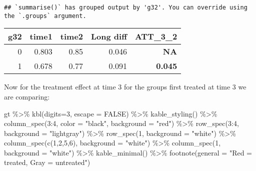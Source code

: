 \documentclass[
]{article}
\newenvironment{Shaded}{\begin{snugshade}}{\end{snugshade}}
\newcommand{\AttributeTok}[1]{\textcolor[rgb]{0.77,0.63,0.00}{#1}}
\newcommand{\ConstantTok}[1]{\textcolor[rgb]{0.00,0.00,0.00}{#1}}
\newcommand{\DecValTok}[1]{\textcolor[rgb]{0.00,0.00,0.81}{#1}}
\newcommand{\FunctionTok}[1]{\textcolor[rgb]{0.00,0.00,0.00}{#1}}
\newcommand{\NormalTok}[1]{#1}
\newcommand{\SpecialCharTok}[1]{\textcolor[rgb]{0.00,0.00,0.00}{#1}}
\newcommand{\StringTok}[1]{\textcolor[rgb]{0.31,0.60,0.02}{#1}}
\begin{document}
\begin{verbatim}
## `summarise()` has grouped output by 'g32'. You can override using the `.groups` argument.
\end{verbatim}

\begin{table}
\centering
\begin{tabular}{r|r|r|r|>{}r}
\hline
g32 & time1 & time2 & Long diff & ATT\_3\_2\\
\hline
0 & 0.803 & 0.85 & 0.046 & \textbf{NA}\\
\hline
1 & 0.678 & 0.77 & 0.091 & \textbf{0.045}\\
\hline
\end{tabular}
\end{table}

Now for the treatment effect at time 3 for the groups first treated at
time 3 we are comparing:

\begin{Shaded}
\begin{Highlighting}[]
\NormalTok{gt }\SpecialCharTok{\%\textgreater{}\%}
  \FunctionTok{kbl}\NormalTok{(}\AttributeTok{digits=}\DecValTok{3}\NormalTok{, }\AttributeTok{escape =} \ConstantTok{FALSE}\NormalTok{) }\SpecialCharTok{\%\textgreater{}\%}
  \FunctionTok{kable\_styling}\NormalTok{() }\SpecialCharTok{\%\textgreater{}\%}
  \FunctionTok{column\_spec}\NormalTok{(}\DecValTok{3}\SpecialCharTok{:}\DecValTok{4}\NormalTok{, }\AttributeTok{color =} \StringTok{"black"}\NormalTok{, }\AttributeTok{background =} \StringTok{"red"}\NormalTok{) }\SpecialCharTok{\%\textgreater{}\%}
  \FunctionTok{row\_spec}\NormalTok{(}\DecValTok{3}\SpecialCharTok{:}\DecValTok{4}\NormalTok{, }\AttributeTok{background  =} \StringTok{"lightgray"}\NormalTok{) }\SpecialCharTok{\%\textgreater{}\%}
  \FunctionTok{row\_spec}\NormalTok{(}\DecValTok{1}\NormalTok{, }\AttributeTok{background =} \StringTok{"white"}\NormalTok{) }\SpecialCharTok{\%\textgreater{}\%}
  \FunctionTok{column\_spec}\NormalTok{(}\FunctionTok{c}\NormalTok{(}\DecValTok{1}\NormalTok{,}\DecValTok{2}\NormalTok{,}\DecValTok{5}\NormalTok{,}\DecValTok{6}\NormalTok{), }\AttributeTok{background =} \StringTok{"white"}\NormalTok{) }\SpecialCharTok{\%\textgreater{}\%}
  \FunctionTok{column\_spec}\NormalTok{(}\DecValTok{1}\NormalTok{, }\AttributeTok{background =} \StringTok{"white"}\NormalTok{) }\SpecialCharTok{\%\textgreater{}\%}
  \FunctionTok{kable\_minimal}\NormalTok{() }\SpecialCharTok{\%\textgreater{}\%}
  \FunctionTok{footnote}\NormalTok{(}\AttributeTok{general =} \StringTok{"Red = treated, Gray = untreated"}\NormalTok{)}
\end{Highlighting}
\end{Shaded}
\end{document}
